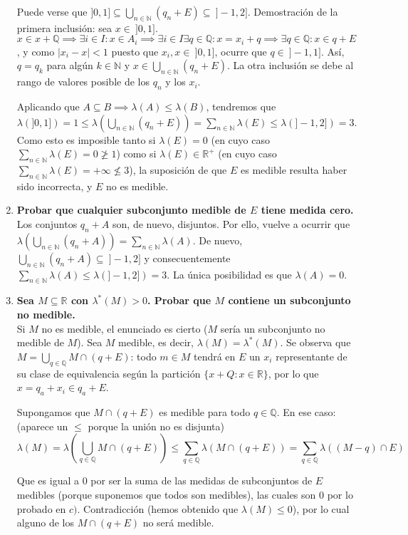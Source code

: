\begin{enumerate}[label=\alph*)]
	Puede verse que $\displaystyle ]0, 1] \subseteq \bigcup_{n \in \mathbb N} (q_n + E) \subseteq \ ]-1, 2]$. Demostración de la primera inclusión: sea $x \in \ ]0, 1]$. $x \in x + \mathbb Q \implies \exists i \in I : x \in A_i \implies \exists i \in I \exists q \in \mathbb Q : x = x_i + q \implies \exists q \in \mathbb Q : x \in q + E$, y como $|x_i-x| < 1$ puesto que $x_i, x \in \ ]0,1]$, ocurre que $q \in \ ]-1,1]$. Así, $q = q_k$ para algún $k \in \mathbb N$ y $\displaystyle x \in \bigcup_{n \in \mathbb N} (q_n + E)$. La otra inclusión se debe al rango de valores posible de los $q_n$ y los $x_i$.
	
	Aplicando que $A \subseteq B \implies \lambda(A) \le \lambda(B)$, tendremos que $\displaystyle \lambda(]0, 1]) = 1 \le \lambda(\bigcup_{n \in \mathbb N} (q_n + E)) = \sum_{n \in \mathbb N} \lambda(E) \le \lambda(]-1, 2]) = 3$. Como esto es imposible tanto si $\lambda(E) = 0$ (en cuyo caso $\displaystyle \sum_{n \in \mathbb N} \lambda(E) = 0 \ngeq 1$) como si $\lambda(E) \in \mathbb R^+$ (en cuyo caso $\displaystyle \sum_{n \in \mathbb N} \lambda(E) = +\infty \nleq 3$), la suposición de que $E$ es medible resulta haber sido incorrecta, y $E$ no es medible.
	
	\item \textbf{Probar que cualquier subconjunto medible de $E$ tiene medida cero.} \\
	
	Los conjuntos $q_n + A$ son, de nuevo, disjuntos. Por ello, vuelve a ocurrir que $\displaystyle \lambda(\bigcup_{n \in \mathbb N} (q_n + A)) = \sum_{n \in \mathbb N} \lambda(A)$. De nuevo, $\displaystyle \bigcup_{n \in \mathbb N} (q_n + A) \subseteq \ ]-1, 2]$ y consecuentemente $\displaystyle \sum_{n \in \mathbb N} \lambda(A) \le \lambda(]-1, 2]) = 3$. La única posibilidad es que $\lambda(A) = 0$.
	
	\item \textbf{Sea $M \subseteq \mathbb R$ con $\lambda^*(M) > 0$. Probar que $M$ contiene un subconjunto no medible.} \\
	
	Si $M$ no es medible, el enunciado es cierto ($M$ sería un subconjunto no medible de $M$). Sea $M$ medible, es decir, $\lambda(M) = \lambda^*(M)$. Se observa que $\displaystyle M = \bigcup_{q \in \mathbb Q} M \cap (q + E)$: todo $m \in M$ tendrá en $E$ un $x_i$ representante de su clase de equivalencia según la partición $\{x + Q : x \in \mathbb R\}$, por lo que $x = q_a + x_i \in q_a + E$.
	
	Supongamos que $M\cap (q + E)$ es medible para todo $q \in \mathbb Q$. En ese caso: (aparece un $\le$ porque la unión no es disjunta)
	$$\displaystyle \lambda(M) = \lambda(\bigcup_{q \in \mathbb Q} M \cap (q + E)) \le \sum_{q \in \mathbb Q} \lambda(M \cap (q+E))  = \sum_{q \in \mathbb Q} \lambda((M-q) \cap E)$$
	
	Que es igual a $0$ por ser la suma de las medidas de subconjuntos de $E$ medibles (porque suponemos que todos son medibles), las cuales son $0$ por lo probado en $c)$. Contradicción (hemos obtenido que $\lambda(M) \le 0$), por lo cual alguno de los $M\cap (q + E)$ no será medible.
\end{enumerate}
 
